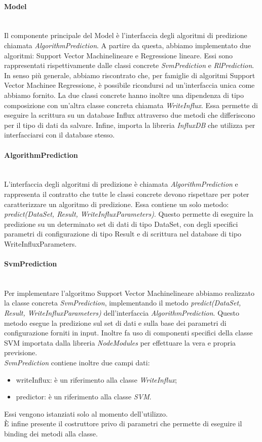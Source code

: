 \paragraph{Model} \mbox{}\\ [1mm]
Il componente principale del Model è l'interfaccia degli algoritmi di predizione chiamata \textit{AlgorithmPrediction}. A partire da questa, abbiamo implementato due algoritmi: Support Vector Machine\glosp lineare e Regressione lineare\glo. Essi sono rappresentati rispettivamente dalle classi concrete \textit{SvmPrediction} e \textit{RlPrediction}. In senso più generale, abbiamo riscontrato che, per famiglie di algoritmi Support Vector Machine\glosp e Regressione\glo, è possibile ricondursi ad un'interfaccia unica come abbiamo fornito.
La due classi concrete hanno inoltre una dipendenza di tipo composizione con un'altra classe concreta chiamata \textit{WriteInflux}. Essa permette di eseguire la scrittura su un database Influx attraverso due metodi che differiscono per il tipo di dati da salvare. Infine, importa la libreria \textit{InfluxDB} che utilizza per interfacciarsi con il database stesso.
\paragraph*{AlgorithmPrediction} \mbox{}\\ [1mm]
L'interfaccia degli algoritmi di predizione è chiamata \textit{AlgorithmPrediction} e rappresenta il contratto che tutte le classi concrete devono rispettare per poter caratterizzare un algoritmo di predizione. Essa contiene un solo metodo: \textit{predict(DataSet, Result, WriteInfluxParameters)}. Questo permette di eseguire la predizione su un determinato set di dati di tipo DataSet, con degli specifici parametri di configurazione di tipo Result e di scrittura nel database di tipo WriteInfluxParameters.
\paragraph*{SvmPrediction} \mbox{}\\ [1mm]
Per implementare l'algoritmo Support Vector Machine\glosp lineare abbiamo realizzato la classe concreta \textit{SvmPrediction}, implementando il metodo \textit{predict(DataSet, Result, WriteInfluxParameters)} dell'interfaccia \textit{AlgorithmPrediction}.
Questo metodo esegue la predizione sul set di dati e sulla base dei parametri di configurazione forniti in input. Inoltre fa uso di componenti specifici della classe SVM importata dalla libreria \textit{NodeModules} per effettuare la vera e propria previsione. \\
\textit{SvmPrediction} contiene inoltre due campi dati:
\begin{itemize}
	\item writeInflux: è un riferimento alla classe \textit{WriteInflux};
	\item predictor: è un riferimento alla classe \textit{SVM}.
\end{itemize}
Essi vengono istanziati solo al momento dell'utilizzo. \\
È infine presente il costruttore privo di parametri che permette di eseguire il binding dei metodi alla classe.
